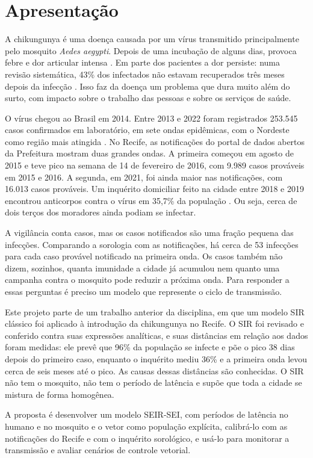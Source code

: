\section{Apresentação}
\label{sec:apresentacao}

A chikungunya é uma doença causada por um vírus transmitido principalmente pelo mosquito \textit{Aedes
aegypti}. Depois de uma incubação de alguns dias, provoca febre e dor articular intensa \cite{who2025}.
Em parte dos pacientes a dor persiste: numa revisão sistemática, 43\% dos infectados não estavam
recuperados três meses depois da infecção \cite{paixao2018}. Isso faz da doença um problema que dura muito
além do surto, com impacto sobre o trabalho das pessoas e sobre os serviços de saúde.

O vírus chegou ao Brasil em 2014. Entre 2013 e 2022 foram registrados 253.545 casos confirmados em
laboratório, em sete ondas epidêmicas, com o Nordeste como região mais atingida \cite{desouza2023}. No
Recife, as notificações do portal de dados abertos da Prefeitura \cite{recife2026} mostram duas grandes
ondas. A primeira começou em agosto de 2015 e teve pico na semana de 14 de fevereiro de 2016, com 9.989
casos prováveis em 2015 e 2016. A segunda, em 2021, foi ainda maior nas notificações, com 16.013 casos
prováveis. Um inquérito domiciliar feito na cidade entre 2018 e 2019 encontrou anticorpos contra o vírus
em 35,7\% da população \cite{braga2023}. Ou seja, cerca de dois terços dos moradores ainda podiam se
infectar.

A vigilância conta casos, mas os casos notificados são uma fração pequena das infecções. Comparando a
sorologia com as notificações, há cerca de 53 infecções para cada caso provável notificado na primeira
onda. Os casos também não dizem, sozinhos, quanta imunidade a cidade já acumulou nem quanto uma campanha
contra o mosquito pode reduzir a próxima onda. Para responder a essas perguntas é preciso um modelo que
represente o ciclo de transmissão.

Este projeto parte de um trabalho anterior da disciplina, em que um modelo SIR clássico foi aplicado à
introdução da chikungunya no Recife. O SIR foi revisado e conferido contra suas expressões analíticas, e
suas distâncias em relação aos dados foram medidas: ele prevê que 96\% da população se infecte e põe o pico
38 dias depois do primeiro caso, enquanto o inquérito mediu 36\% e a primeira onda levou cerca de seis meses
até o pico. As causas dessas distâncias são conhecidas. O SIR não tem o mosquito, não tem o período de
latência e supõe que toda a cidade se mistura de forma homogênea.

A proposta é desenvolver um modelo SEIR-SEI, com períodos de latência no humano e no mosquito e o vetor
como população explícita, calibrá-lo com as notificações do Recife e com o inquérito sorológico, e usá-lo para monitorar
a transmissão e avaliar cenários de controle vetorial.
